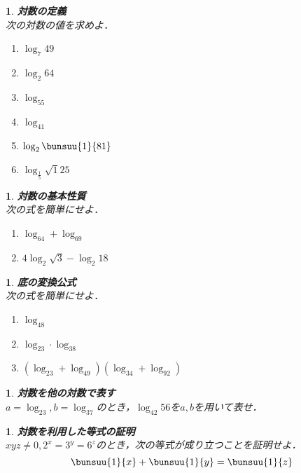 \documentclass[10pt,
fleqn,
dvipdfmx,
uplatex
]{jsarticle}
\newtheorem{question}[Question]{}
\begin{document}
\begin{question}{\bf\boldmath 対数の定義}\\
次の対数の値を求めよ．
\begin{enumerate}
\item $\log _7{49}$
\item $\log _2{64}$
\item $\log _55$
\item $\log _41$
\item $\log _2\bunsuu{1}{{}81}$
\item $\log _{\frac{1}{5}}{\sqrt 125}$
\end{enumerate}

\end{question}



\begin{question}{\bf\boldmath 対数の基本性質}\\
次の式を簡単にせよ．
\begin{enumerate}
\item $\log _64+\log _69$
\item $4\log _2\sqrt 3-\log _2{18}$
\end{enumerate}

\end{question}



\begin{question}{\bf\boldmath 底の変換公式}\\
次の式を簡単にせよ．
\begin{enumerate}
\item $\log _48$
\item $\log _23\cdot \log _38$
\item $\left(\log _23+\log _49\right)\left(\log _34+\log _92\right)$
\end{enumerate}

\end{question}



\begin{question}{\bf\boldmath 対数を他の対数で表す}\\
$a=\log _23, b=\log _37$のとき，$\log _{42}{56}$を$a, b$を用いて表せ．
\end{question}



\begin{question}{\bf\boldmath 対数を利用した等式の証明}\\
$xyz\neq 0, 2^x=3^y=6^z$のとき，次の等式が成り立つことを証明せよ．
\[\bunsuu{1}{x}+\bunsuu{1}{y}=\bunsuu{1}{z}\]
\end{question}
\end{document}
